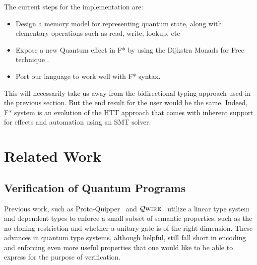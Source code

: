\documentclass[acmsmall,nonacm,timestamp,review=false,anonymous=false]{acmart}
\newcommand{\qwire}{\ensuremath{\mathcal{Q}\textsc{wire}}\xspace}
\begin{document}
The current steps for the implementation are:

\begin{itemize}
	\item Design a memory model for representing quantum state, along with elementary operations such as read, write, lookup, etc
	\item Expose a new Quantum effect in F* by using the Dijkstra Monads for Free technique \cite{dm4free2017}.
	\item Port our language to work well with F* syntax.
\end{itemize}

This will necessarily take us away from the bidirectional typing approach used in the previous section. But the end result for the user would be the same. Indeed, F* system is an evolution of the HTT approach that comes with inherent support for effects and automation using an SMT solver.




\section{Related Work}
\label{sec:related}


\subsection{Verification of Quantum Programs}
Previous work, such as Proto-Quipper~\cite{ross_algebraic_2015,rios_categorical_2017} and \qwire~\cite{paykin_qwire:_2017,rand_qwire_2017,rand_formally_2018} utilize a linear type system and dependent types to enforce a small subset of semantic properties, such as the no-cloning restriction and whether a unitary gate is of the right dimension. These advances in quantum type systems, although helpful, still fall short in encoding and enforcing even more useful properties that one would like to be able to express for the purpose of verification.
\end{document}
